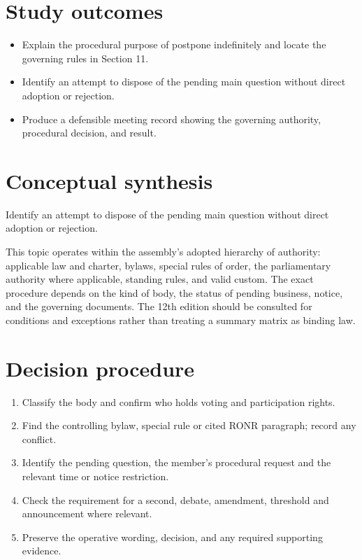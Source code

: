 \documentclass[11pt]{article}
\begin{document}
\SuiteOpen
{}
\section{Study outcomes}
\begin{itemize}[leftmargin=*,itemsep=4pt]
\item Explain the procedural purpose of postpone indefinitely and locate the governing rules in Section 11.
\item Identify an attempt to dispose of the pending main question without direct adoption or rejection.
\item Produce a defensible meeting record showing the governing authority, procedural decision, and result.
\end{itemize}

\section{Conceptual synthesis}
Identify an attempt to dispose of the pending main question without direct adoption or rejection.

This topic operates within the assembly’s adopted hierarchy of authority: applicable law and charter, bylaws, special rules of order, the parliamentary authority where applicable, standing rules, and valid custom. The exact procedure depends on the kind of body, the status of pending business, notice, and the governing documents. The 12th edition should be consulted for conditions and exceptions rather than treating a summary matrix as binding law.
\section{Decision procedure}
\begin{enumerate}[leftmargin=*,itemsep=4pt]
\item Classify the body and confirm who holds voting and participation rights.
\item Find the controlling bylaw, special rule or cited RONR paragraph; record any conflict.
\item Identify the pending question, the member’s procedural request and the relevant time or notice restriction.
\item Check the requirement for a second, debate, amendment, threshold and announcement where relevant.
\item Preserve the operative wording, decision, and any required supporting evidence.
\end{enumerate}
\end{document}
